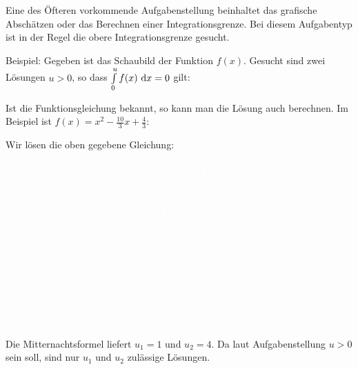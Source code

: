 Eine des Öfteren vorkommende Aufgabenstellung beinhaltet das grafische Abschätzen oder das Berechnen einer Integrationsgrenze. Bei diesem Aufgabentyp ist in der Regel die obere Integrationsgrenze gesucht.

Beispiel: Gegeben ist das Schaubild der Funktion \(f(x)\). Gesucht sind zwei Lösungen \(u>0\), so dass \(\int\limits_0^u f(x) \ \text{d} x=0\) gilt:

\begin{minipage}{\textwidth}
\end{minipage}

\bigskip

Ist die Funktionsgleichung bekannt, so kann man die Lösung auch berechnen. Im Beispiel ist \(f(x)=x^2-\frac{10}{3}x+\frac{4}{3}\):

\textcolor{loes}{Wir lösen die oben gegebene Gleichung:}
\begin{align*}
	\textcolor{loes}{\int\limits_0^u f(x) \td x}&\textcolor{loes}{\;=0}\\
	\textcolor{loes}{\int\limits_0^u x^2-\frac{10}{3}x+\frac{4}{3} \td x}&\textcolor{loes}{\;=0}\\
	\textcolor{loes}{\left[\frac{1}{3}x^3-\frac{5}{3}x^2+\frac{4}{3}x \right]_0^u}&\textcolor{loes}{\;=0}\\
	\textcolor{loes}{\frac{1}{3}u^3-\frac{5}{3}u^2+\frac{4}{3}u}&\textcolor{loes}{\;=0}\\
	\textcolor{loes}{u\left(\frac{1}{3}u^2-\frac{5}{3}u+\frac{4}{3}\right)}&\textcolor{loes}{\;=0}\\
	\textcolor{loes}{\text{S.v.N.: }u_0=0\text{ oder }\frac{1}{3}u^2-\frac{5}{3}u+\frac{4}{3}}&\textcolor{loes}{\;=0}
\end{align*}
\textcolor{loes}{Die Mitternachtsformel liefert \(u_1=1\) und \(u_2=4\). Da laut Aufgabenstellung \(u>0\) sein soll, sind nur \(u_1\) und \(u_2\) zulässige Lösungen.}
\newpage

